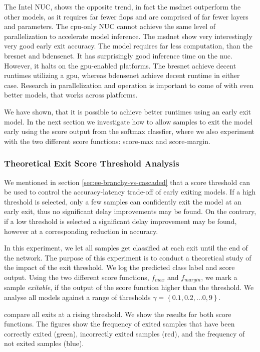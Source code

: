 The Intel NUC, shows the opposite trend, in fact the \gls{msdnet} outperform the other models, as it requires far fewer \gls{flop}s and are comprised of far fewer layers and parameters. The \gls{cpu}-only NUC cannot achieve the same level of parallelization to accelerate model inference. The \gls{msdnet} \cite{huang_multi-scale_2017} show very interestingly very good early exit accuracy. The model requires far less computation, than the \gls{bresnet} and \gls{bdensenet}. It has surprisingly good inference time on the \gls{nuc}. However, it halts on the \gls{gpu}-enabled platforms. The \gls{bresnet} achieve decent runtimes utilizing a \gls{gpu}, whereas \gls{bdensenet} achieve decent runtime in either case. Research in parallelization and operation is important to come of with even better models, that works across platforms.

We have shown, that it is possible to achieve better runtimes using an early exit model. In the next section we investigate how to allow samples to exit the model early using the score output from the softmax classfier, where we also experiment with the two different score functions: score-max and score-margin.

\subsubsection{Theoretical Exit Score Threshold Analysis}

We mentioned in section \ref{sec:ee-branchy-vs-cascaded} that a score threshold can be used to control the accuracy-latency trade-off of early exiting models. If a high threshold is selected, only a few samples can confidently exit the model at an early exit, thus no significant delay improvements may be found. On the contrary, if a low threshold is selected a significant delay improvement may be found, however at a corresponding reduction in accuracy. 

In this experiment, we let all samples get classified at each exit until the end of the network. The purpose of this experiment is to conduct a theoretical study of the impact of the exit threshold. We log the predicted class label and score output. Using the two different score functions, $ f_{max} $ and $ f_{margin} $, we mark a sample \emph{exitable}, if the output of the score function higher than the threshold. We analyse all models against a range of thresholds $ \gamma = \left\{0.1, 0.2, \dots 0,9\right\} $.

 compare all exits at a rising threshold. We show the results for both score functions.
The figures show the frequency of exited samples that have been correctly exited ({\color{sns-green}green}), incorrectly exited samples ({\color{sns-red}red}), and the frequency of not exited samples ({\color{sns-blue}blue}). 

